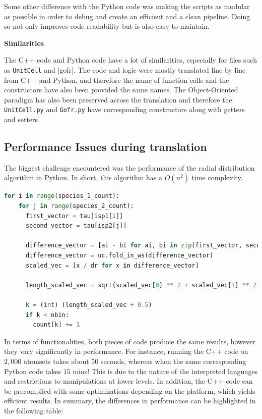 Some other difference with the Python code was making the scripts as modular as possible in order to debug and create an efficient and a clean pipeline. Doing so not only improves code readability but is also easy to maintain. 

\textbf{Similarities}

The C++ code and Python code have a lot of similarities, especially for files such as \verb|UnitCell| and |gofr|. The code and logic were mostly translated line by line from C++ and Python, and therefore the name of function calls and the constructors have also been provided the same names. The Object-Oriented paradigm has also been preserved across the translation and therefore the \verb|UnitCell.py| and \verb|Gofr.py| have corresponding constructors along with getters and setters. 

\subsection*{Performance Issues during translation}

The biggest challenge encountered was the performance of the radial distribution algorithm in Python. In short, this algorithm has a $O(n^2)$ time complexity.  

\begin{lstlisting}[language=Python, caption=Python Code which computes the gofr.]
 for i in range(species_1_count):
    for j in range(species_2_count):
      first_vector = tau[isp1[i]]
      second_vector = tau[isp2[j]]
      
      difference_vector = [ai - bi for ai, bi in zip(first_vector, second_vector)]
      difference_vector = uc.fold_in_ws(difference_vector)
      scaled_vec = [x / dr for x in difference_vector]
      
      length_scaled_vec = sqrt(scaled_vec[0] ** 2 + scaled_vec[1] ** 2 + scaled_vec[2] ** 2)
     
      k = (int) (length_scaled_vec + 0.5)
      if k < nbin:
        count[k] += 1
\end{lstlisting}

In terms of functionalities, both pieces of code produce the same results, however they vary significantly in performance. For instance, running the C++ code on $2,000$ atomsets takes about $50$ seconds, whereas when the same corresponding Python code takes $15$ mins! This is due to the nature of the interpreted languages and restrictions to manipulations at lower levels. In addition, the C++ code can be precompiled with some optimizations depending on the platform, which yields efficient results. In summary, the differences in performance can be highlighted in the following table:

